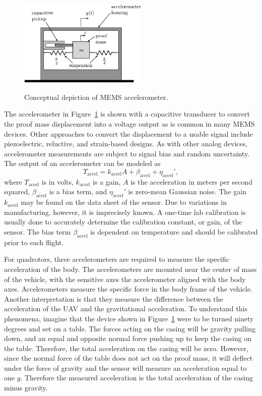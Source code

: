 \begin{figure}[htb]
  \centering
  \includegraphics[width=0.55\textwidth]{chap11_attitude_estimation/figures/sensors-accel}\\
  \caption{Conceptual depiction of MEMS accelerometer.}
  \label{fig:sensors-accel}
\end{figure}

The accelerometer in Figure~\ref{fig:sensors-accel} is shown with a capacitive transducer to convert the proof mass displacement into a voltage output as is common in many MEMS devices. Other approaches to convert the displacement to a usable signal include piezoelectric, reluctive, and strain-based designs. As with other analog devices, accelerometer measurements are subject to signal bias and random uncertainty. The output of an
accelerometer can be modeled as
\[
\Upsilon_{\text{accel}} = k_{\text{accel}} A + \beta_{\text{accel}} + \eta_{\text{accel}}',
\]
where $\Upsilon_{\text{accel}}$ is in volts, $k_{\text{accel}}$ is a gain, $A$ is the
acceleration in meters per second squared, $\beta_{\text{accel}}$ is a bias term,
and $\eta_{\text{accel}}'$ is zero-mean Gaussian noise.  The gain $k_{\text{accel}}$
may be found on the data sheet of the sensor. Due to
variations in manufacturing, however, it is imprecisely known. A one-time lab calibration is
usually done to accurately determine the calibration constant, or gain, of the sensor.
The bias term $\beta_{\text{accel}}$ is dependent on temperature and should
be calibrated prior to each flight.

For quadrotors, three accelerometers are required to measure the specific acceleration of the body.  The accelerometers are mounted near the center of mass of the vehicle, with the sensitive axes the accelerometer aligned with the body axes. Accelerometers measure the specific force in the body frame of the
vehicle.  Another interpretation is that they measure the difference between the acceleration of the UAV and the gravitational acceleration. To understand this phenomena, imagine that the device shown in Figure~\ref{fig:sensors-accel} were to be turned ninety degrees and set on a table.  The forces acting on the casing will be gravity pulling down, and an equal and opposite normal force pushing up to keep the casing on the table.  Therefore, the total acceleration on the casing will be zero.  However, since the normal force of the table does not act on the proof mass, it will deflect under the force of gravity and the sensor will measure an acceleration equal to one $g$.   Therefore the measured acceleration is the total acceleration of the casing minus gravity.

